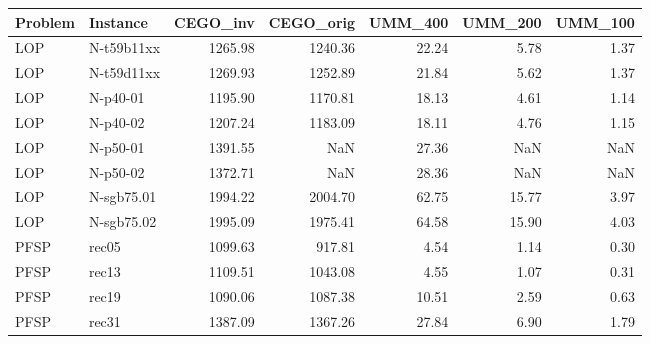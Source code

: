 \documentclass[sigconf,dvipsnames]{acmart}
\begin{document}
\begin{table}[tb]%
\begin{tabular}{llrrrrr}
\toprule
Problem &    Instance &  CEGO\_inv &  CEGO\_orig &  UMM\_400 &  UMM\_200 &  UMM\_100 \\
\midrule
    LOP &  N-t59b11xx &   1265.98 &    1240.36 &    22.24 &     5.78 &     1.37 \\
    LOP &  N-t59d11xx &   1269.93 &    1252.89 &    21.84 &     5.62 &     1.37 \\
    LOP &    N-p40-01 &   1195.90 &    1170.81 &    18.13 &     4.61 &     1.14 \\
    LOP &    N-p40-02 &   1207.24 &    1183.09 &    18.11 &     4.76 &     1.15 \\
    LOP &    N-p50-01 &   1391.55 &        NaN &    27.36 &      NaN &      NaN \\
    LOP &    N-p50-02 &   1372.71 &        NaN &    28.36 &      NaN &      NaN \\
    LOP &  N-sgb75.01 &   1994.22 &    2004.70 &    62.75 &    15.77 &     3.97 \\
    LOP &  N-sgb75.02 &   1995.09 &    1975.41 &    64.58 &    15.90 &     4.03 \\
   PFSP &       rec05 &   1099.63 &     917.81 &     4.54 &     1.14 &     0.30 \\
   PFSP &       rec13 &   1109.51 &    1043.08 &     4.55 &     1.07 &     0.31 \\
   PFSP &       rec19 &   1090.06 &    1087.38 &    10.51 &     2.59 &     0.63 \\
   PFSP &       rec31 &   1387.09 &    1367.26 &    27.84 &     6.90 &     1.79 \\
\bottomrule
\end{tabular}
\end{table}
\end{document}
